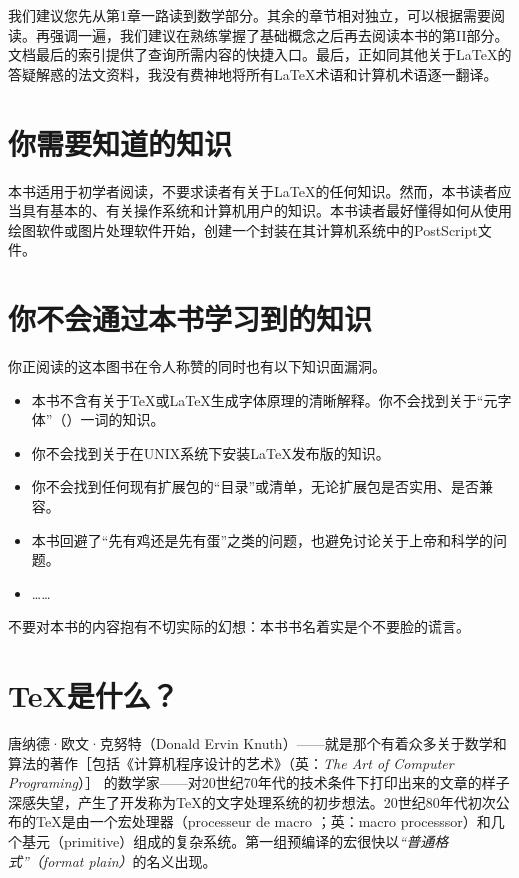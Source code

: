 我们建议您先从第1章一路读到数学部分。其余的章节相对独立，可以根据需要阅读。再强调一遍，我们建议在熟练掌握了基础概念之后再去阅读本书的第II部分。文档最后的索引提供了查询所需内容的快捷入口。最后，正如同其他关于\LaTeX 的答疑解惑的法文资料，我没有费神地将所有\LaTeX 术语和计算机术语逐一翻译。

\section*{你需要知道的知识}

本书适用于初学者阅读，不要求读者有关于\LaTeX 的任何知识。然而，本书读者应当具有基本的、有关操作系统和计算机用户的知识。本书读者最好懂得如何从使用绘图软件或图片处理软件开始，创建一个封装在其计算机系统中的PostScript文件。

\section*{你不会通过本书学习到的知识}

你正阅读的这本图书在令人称赞的同时也有以下知识面漏洞。

\begin{itemize}
    \item 本书不含有关于\TeX 或\LaTeX 生成字体原理的清晰解释。你不会找到关于“元字体”\linebreak （\MF）一词的知识。
    \item 你不会找到关于在UNIX系统下安装\LaTeX 发布版的知识。
    \item 你不会找到任何现有扩展包的“目录”或清单，无论扩展包是否实用、是否兼容。
    \item 本书回避了“先有鸡还是先有蛋”之类的问题，也避免讨论关于上帝和科学的问题。
    \item ……
\end{itemize}

\begin{exclamation}
不要对本书的内容抱有不切实际的幻想：本书书名着实是个不要脸的谎言。
\end{exclamation}

\section*{\TeX 是什么？}

唐纳德·欧文·克努特（Donald Ervin Knuth）——就是那个有着众多关于数学和算法的著作［包括《计算机程序设计的艺术》（英：\emph{The Art of Computer Programing}）］%
的数学家——对20世纪70年代的技术条件下打印出来的文章的样子深感失望，产生了开发称为\TeX 的文字处理系统的初步想法。20世纪80年代初次公布的\TeX 是由一个宏处理器（processeur de macro ；英：macro processsor）和几个基元（primitive）组成的复杂系统。第一组预编译的宏很快以\emph{“普通格式”（format plain）}的名义出现。

